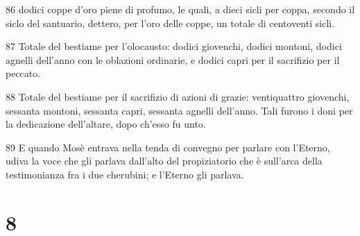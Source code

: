 \par 86 dodici coppe d'oro piene di profumo, le quali, a dieci sicli per coppa, secondo il siclo del santuario, dettero, per l'oro delle coppe, un totale di centoventi sicli.
\par 87 Totale del bestiame per l'olocausto: dodici giovenchi, dodici montoni, dodici agnelli dell'anno con le oblazioni ordinarie, e dodici capri per il sacrifizio per il peccato.
\par 88 Totale del bestiame per il sacrifizio di azioni di grazie: ventiquattro giovenchi, sessanta montoni, sessanta capri, sessanta agnelli dell'anno. Tali furono i doni per la dedicazione dell'altare, dopo ch'esso fu unto.
\par 89 E quando Mosè entrava nella tenda di convegno per parlare con l'Eterno, udiva la voce che gli parlava dall'alto del propiziatorio che è sull'arca della testimonianza fra i due cherubini; e l'Eterno gli parlava.

\chapter{8}

